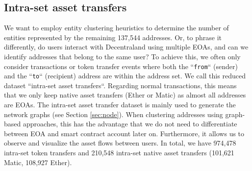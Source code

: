 \documentclass[12pt,a4paper,titlepage,oneside,english]{article}
\begin{document}
\subsection{Intra-set asset transfers}
\label{sec:intra-set}
We want to employ entity clustering heuristics to determine the number of entities represented by the remaining 137,544 addresses. Or, to phrase it differently, do users interact with Decentraland using multiple EOAs, and can we identify addresses that belong to the same user?
\newline
To achieve this, we often only consider transactions or token transfer events where both the ``\texttt{from}`` (sender) and the ``\texttt{to}`` (recipient) address are within the address set. We call this reduced dataset ``intra-set asset transfers``. Regarding normal transactions, this means that we only keep native asset transfers (Ether or Matic) as almost all addresses are EOAs. \newline
The intra-set asset transfer dataset is mainly used to generate the network graphs (see Section \ref{sec:node}). %
When clustering addresses using graph-based approaches, this has the advantage that we do not need to differentiate between EOA and smart contract account later on. Furthermore, it allows us to observe and visualize the asset flows between users. In total, we have 974,478 intra-set token transfers and 210,548 intra-set native asset transfers (101,621 Matic, 108,927 Ether). 
\end{document}
